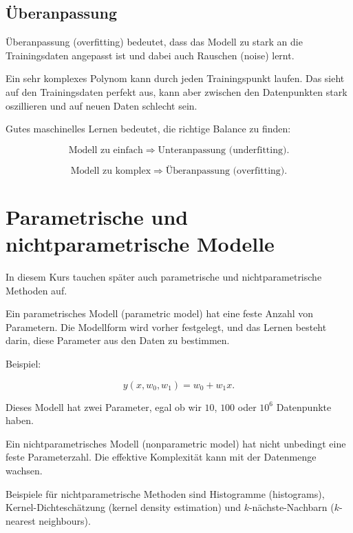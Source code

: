 \subsection{Überanpassung}

Überanpassung (overfitting) bedeutet, dass das Modell zu stark an die Trainingsdaten angepasst ist und dabei auch Rauschen (noise) lernt.

\begin{examplebox}
Ein sehr komplexes Polynom kann durch jeden Trainingspunkt laufen.
Das sieht auf den Trainingsdaten perfekt aus, kann aber zwischen den Datenpunkten stark oszillieren und auf neuen Daten schlecht sein.
\end{examplebox}

\begin{conceptbox}
Gutes maschinelles Lernen bedeutet, die richtige Balance zu finden:

\[
    \text{Modell zu einfach}
    \Rightarrow
    \text{Unteranpassung (underfitting)}.
\]

\[
    \text{Modell zu komplex}
    \Rightarrow
    \text{Überanpassung (overfitting)}.
\]
\end{conceptbox}

\section{Parametrische und nichtparametrische Modelle}

In diesem Kurs tauchen später auch parametrische und nichtparametrische Methoden auf.

\begin{definitionbox}
Ein parametrisches Modell (parametric model) hat eine feste Anzahl von Parametern.
Die Modellform wird vorher festgelegt, und das Lernen besteht darin, diese Parameter aus den Daten zu bestimmen.
\end{definitionbox}

Beispiel:

\[
    y(x,w_0,w_1) = w_0 + w_1x.
\]

Dieses Modell hat zwei Parameter, egal ob wir \(10\), \(100\) oder \(10^6\) Datenpunkte haben.

\begin{definitionbox}
Ein nichtparametrisches Modell (nonparametric model) hat nicht unbedingt eine feste Parameterzahl.
Die effektive Komplexität kann mit der Datenmenge wachsen.
\end{definitionbox}

Beispiele für nichtparametrische Methoden sind Histogramme (histograms), Kernel-Dichteschätzung (kernel density estimation) und \(k\)-nächste-Nachbarn (\(k\)-nearest neighbours).

